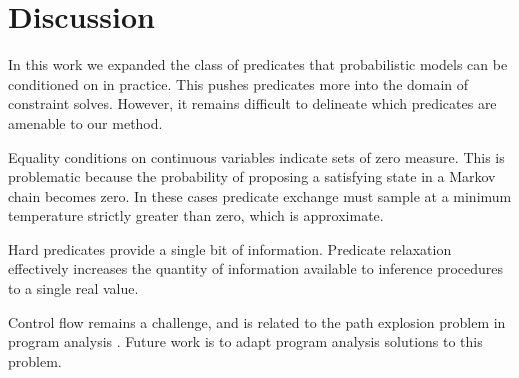 \section{Discussion}
In this work we expanded the class of predicates that probabilistic models can be conditioned on in practice.
This pushes predicates more into the domain of constraint solves.
However, it remains difficult to delineate which predicates are amenable to our method.

Equality conditions on continuous variables indicate sets of zero measure.
This is problematic because the probability of proposing a satisfying state in a Markov chain becomes zero.
In these cases predicate exchange must sample at a minimum temperature strictly greater than zero, which is approximate.

Hard predicates provide a single bit of information.
Predicate relaxation effectively increases the quantity of information available to inference procedures to a single real value.

Control flow remains a challenge, and is related to the path explosion problem in program analysis \cite{cadar2008exe, sen2005cute}.
Future work is to adapt program analysis solutions to this problem.



